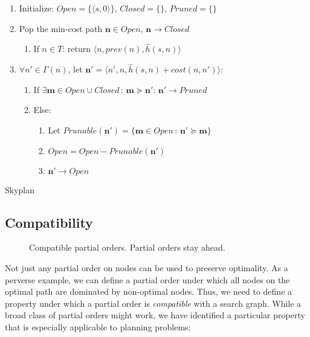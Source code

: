 \documentclass[letterpaper]{article}
\theoremstyle{plain} \newtheorem{theorem}{Theorem} \newtheorem{proposition}{Proposition} \newtheorem{lemma}{Lemma} \newtheorem*{corollary}{Corollary}
\theoremstyle{definition} \newtheorem{definition}{Definition} \newtheorem{conjecture}{Conjecture} \newtheorem*{example}{Example}
\theoremstyle{remark} \newtheorem*{remark}{Remark} \newtheorem*{note}{Note} \newtheorem{case}{Case}
\begin{document}
\begin{algorithm}
\begin{enumerate}
\item Initialize: $Open=\{\langle s,0\rangle\}$, $Closed=\{\}$,
$Pruned=\{\}$
\item Pop the min-cost path $\mathbf{n}\in Open$, $\mathbf{n}\rightarrow Closed$

\begin{enumerate}
\item If $n\in T$: return $\langle n,prev(n),\hat{h}(s,n)\rangle$
\end{enumerate}
\item $\forall n\prime\in\Gamma(n)$, let $\mathbf{n\prime}=\langle n\prime,n,\hat{h}(s,n)+cost(n,n\prime)\rangle$:

\begin{enumerate}
\item If $\exists\mathbf{m}\in Open\cup Closed\,:\,\mathbf{m}\succeq\mathbf{n\prime}$:
$\mathbf{n\prime}\rightarrow Pruned$
\item Else: 

\begin{enumerate}
\item Let $Prunable(\mathbf{n\prime})=\{\mathbf{m}\in Open\,:\,\mathbf{n\prime}\succeq\mathbf{m}\}$
\item $Open=Open-Prunable(\mathbf{n\prime})$
\item $\mathbf{n\prime}\rightarrow Open$ 
\end{enumerate}
\end{enumerate}
\end{enumerate}
\caption{Skyplan}
\label{alg:skyplan}
\end{algorithm}

\subsection{Compatibility}
\begin{figure}
  \caption{Compatible partial orders. Partial orders stay ahead.}
\end{figure}

Not just any partial order on nodes can be used to preserve optimality. As a perverse
example, we can define a partial order under which all nodes on the optimal path
are dominated by non-optimal nodes. Thus, we need to define a property
under which a partial order is \textit{compatible} with a search graph. While
a broad class of partial orders might work, we have identified a particular 
property that is especially applicable to planning problems:
\end{document}
